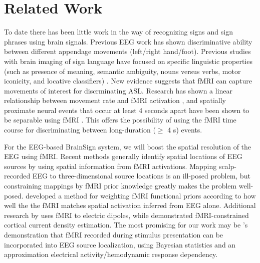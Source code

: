 \documentclass{proposal}
\begin{document}
\section{Related Work}

To date there has been little work in the way of recognizing signs and sign phrases using brain signals. Previous EEG work has shown discriminative ability between different appendage movements (left/right hand/foot). Previous studies with brain imaging of sign language have focused on specific linguistic properties (such as presence of meaning, semantic ambiguity, nouns versus verbs, motor iconicity, and locative classifiers) \cite{supp2005_smr, tranel2005_env, lee2006_mme, dehaene1995_eec, hjorth1975_oie, perrin1988_sss, corina2003_llb, emmorey2004_mis, emmorey_broca_region_2006}. New evidence suggests that fMRI can capture movements of interest for discrminating ASL. Research has shown a linear relationship between movement rate and fMRI activation \cite{rao1996rbf}, and spatially proximate neural events that occur at least 4 seconds apart have been shown to be separable using fMRI \cite{kim1997ltr}. This offers the possibility of using the fMRI time course for discriminating between long-duration ($\geq$ 4 s) events.

For the EEG-based BrainSign system, we will boost the spatial resolution of the EEG using fMRI. Recent methods generally identify spatial locations of EEG sources by using spatial information from fMRI activations. Mapping scalp-recorded EEG to three-dimensional source locations is an ill-posed problem, but constraining mappings by fMRI prior knowledge greatly makes the problem well-posed. \cite{im2006tcm} developed a method for weighting fMRI functional priors according to how well the the fMRI matches spatial activation inferred from EEG alone. Additional research by \cite{ahlfors1999sac} uses fMRI to electric dipoles, while \cite{wagner2000fcd} demonstrated fMRI-constrained cortical current density estimation. The most promising for our work may be \cite{dale2000dsp}'s demonstration that fMRI recorded during stimulus presentation can be incorporated into EEG source localization, using Bayesian statistics and an approximation electrical activity/hemodynamic response dependency.
\end{document}
